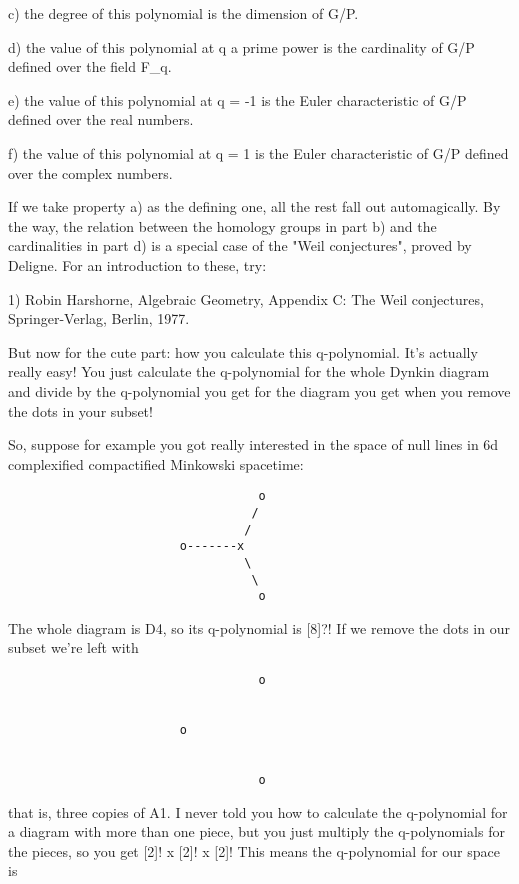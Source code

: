 c) the degree of this polynomial is the dimension of G/P.

d) the value of this polynomial at q a prime power is the cardinality
of G/P defined over the field F_{q}.

e) the value of this polynomial at q = -1 is the Euler characteristic
of G/P defined over the real numbers.

f) the value of this polynomial at q = 1 is the Euler characteristic
of G/P defined over the complex numbers.

If we take property a) as the defining one, all the rest fall out
automagically.  By the way, the relation between the homology 
groups in part b) and the cardinalities in part d) is a special 
case of the "Weil conjectures", proved by Deligne.
For an introduction to these, try:

1) 
Robin Harshorne, Algebraic Geometry, Appendix C: The Weil conjectures,
Springer-Verlag, Berlin, 1977.

But now for the cute part: how you calculate this q-polynomial. 
It's actually really easy!  You just calculate the q-polynomial for the
whole Dynkin diagram and divide by the q-polynomial you get for the
diagram you get when you remove the dots in your subset!

So, suppose for example you got really interested in the space of 
null lines in 6d complexified compactified Minkowski spacetime:
  
\begin{verbatim}
                                   o 
                                  /
                                 /
                        o-------x 
                                 \
                                  \
                                   o
\end{verbatim}
    
The whole diagram is D4, so its q-polynomial is [8]?!   If we remove 
the dots in our subset we're left with 
  
\begin{verbatim}
                                   o 
                         

                        o
                         

                                   o
\end{verbatim}
    
that is, three copies of A1.  I never told you how to calculate the
q-polynomial for a diagram with more than one piece, but you just
multiply the q-polynomials for the pieces, so you get [2]! x [2]! x [2]!
This means the q-polynomial for our space is

